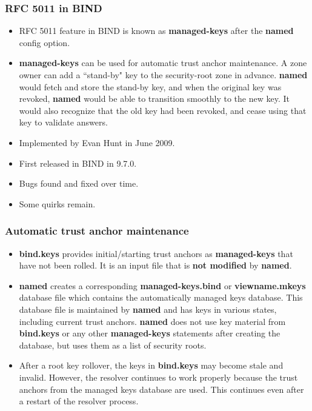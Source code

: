\documentclass{beamer}
\begin{document}
\frame
{
  \frametitle{RFC 5011 in BIND}

  \begin{itemize}
  \item RFC 5011 feature in BIND is known as \textbf{managed-keys} after
    the \textbf{named} config option.
  \item \textbf{managed-keys} can be used for automatic trust anchor
    maintenance. A zone owner can add a ``stand-by" key to the
    security-root zone in advance. \textbf{named} would fetch and store
    the stand-by key, and when the original key was revoked,
    \textbf{named} would be able to transition smoothly to the new
    key. It would also recognize that the old key had been revoked, and
    cease using that key to validate answers.
  \item Implemented by Evan Hunt in June 2009.
  \item First released in BIND in 9.7.0.
  \item Bugs found and fixed over time.
  \item Some quirks remain.
  \end{itemize}
}

\frame
{
  \frametitle{Automatic trust anchor maintenance}

  \begin{itemize}

  \item \textbf{bind.keys} provides initial/starting trust anchors as
    \textbf{managed-keys} that have not been rolled. It is an input file that is
    \textbf{not modified} by \textbf{named}.

  \item \textbf{named} creates a corresponding
    \textbf{managed-keys.bind} or \textbf{viewname.mkeys} database file
    which contains the automatically managed keys database. This
    database file is maintained by \textbf{named} and has keys in
    various states, including current trust anchors. \textbf{named} does
    not use key material from \textbf{bind.keys} or any other
    \textbf{managed-keys} statements after creating the database, but
    uses them as a list of security roots.

  \item After a root key rollover, the keys in \textbf{bind.keys} may
    become stale and invalid. However, the resolver continues to work
    properly because the trust anchors from the managed keys database
    are used. This continues even after a restart of the resolver
    process.

  \end{itemize}
}
\end{document}
